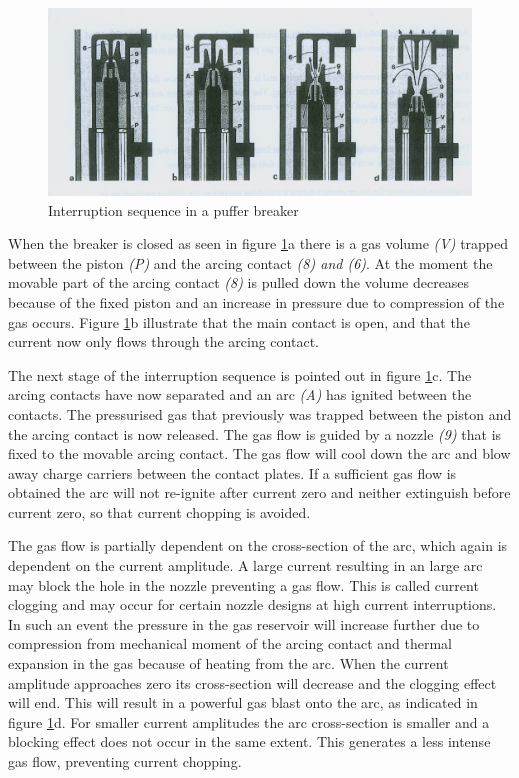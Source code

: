 \documentclass[10pt,a4paper]{article} %
\begin{document}
\begin{figure} [H]
\centering
\includegraphics[scale=0.8]{Bilder/Theory/CircutBreakPuff1.png}
\caption{Interruption sequence in a puffer breaker \cite{bib:HVEbreak}} \label{fig:CircutBreakPuff1}
\end{figure}

When the breaker is closed as seen in figure \ref{fig:CircutBreakPuff1}a there is a gas volume \textit{(V)} trapped between the piston \textit{(P)} and the arcing contact \textit{(8) and (6)}. At the moment the movable part of the arcing contact \textit{(8)} is pulled down the volume decreases because of the fixed piston and an increase in pressure due to compression of the gas occurs. Figure \ref{fig:CircutBreakPuff1}b illustrate that the main contact is open, and that the current now only flows through the arcing contact.

The next stage of the interruption sequence is pointed out in figure \ref{fig:CircutBreakPuff1}c. The arcing contacts have now separated and an arc \textit{(A)} has ignited between the contacts. The pressurised gas that previously was trapped between the piston and the arcing contact is now released. The gas flow is guided by a nozzle \textit{(9)} that is fixed to the movable arcing contact. The gas flow will cool down the arc and blow away charge carriers between the contact plates. If a sufficient gas flow is obtained the arc will not re-ignite after current zero and neither extinguish before current zero, so that current chopping is avoided.

The gas flow is partially dependent on the cross-section of the arc, which again is dependent on the current amplitude. A large current resulting in an large arc may block the hole in the nozzle preventing a gas flow. This is called current clogging and may occur for certain nozzle designs at high current interruptions. In such an event the pressure in the gas reservoir will increase further due to compression from mechanical moment of the arcing contact and thermal expansion in the gas because of heating from the arc. When the current amplitude approaches zero its cross-section will decrease and the clogging effect will end. This will result in a powerful gas blast onto the arc, as indicated in figure \ref{fig:CircutBreakPuff1}d. For smaller current amplitudes the arc cross-section is smaller and a blocking effect does not occur in the same extent. This generates a less intense gas flow, preventing current chopping.
 
\end{document}
